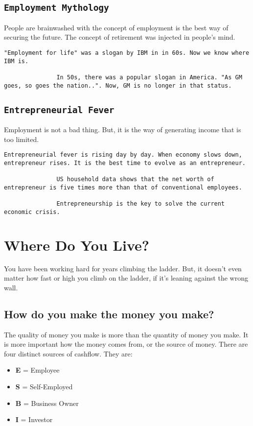 \documentclass[a4paper, 12pt]{report}
\begin{document}
    \section{\texttt{Employment Mythology}}

    People are brainwashed with the concept of employment is the best way of securing the future. The concept of retirement was injected in people's mind.
    
    \begin{lstlisting}[style=latexFrameTB]
               "Employment for life" was a slogan by IBM in in 60s. Now we know where IBM is.
               
               In 50s, there was a popular slogan in America. "As GM goes, so goes the nation..". Now, GM is no longer in that status.
    \end{lstlisting}
    \section{\texttt{Entrepreneurial Fever}}
    Employment is not a bad thing. But, it is the way of generating income that is too limited. 
    
    \begin{lstlisting}[style=latexFrameTB]
               Entrepreneurial fever is rising day by day. When economy slows down, entrepreneur rises. It is the best time to evolve as an entrepreneur.
               
               US household data shows that the net worth of entrepreneur is five times more than that of conventional employees.
               
               Entrepreneurship is the key to solve the current economic crisis.
    \end{lstlisting}
    
   \chapter{Where Do You Live?}
   You have been working hard for years climbing the ladder. But, it doesn't even matter how fast or high you climb on the ladder, if it's leaning against the wrong wall.
   
    \section{How do you make the money you make?}
    The quality of money you make is more than the quantity of money you make. It is more important how the money comes from, or the source of money. There are four distinct sources of cashflow. They are:
    \begin{itemize}
        \item \textbf{E} = Employee
        \item \textbf{S} = Self-Employed
        \item \textbf{B} = Business Owner
        \item \textbf{I} = Investor
        
    \end{itemize}
    
\end{document}
